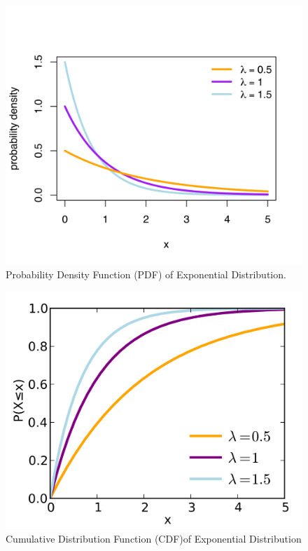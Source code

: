 \begin{figure}[h!]
\begin{center}
	\includegraphics[scale=0.1]{exponential_pdf.png}
	\caption[]{Probability Density Function (PDF) of Exponential Distribution.}
	\label{fairdiepmf}
	\end{center}
	\end{figure}
	
\begin{figure}[h!]
\begin{center}
	\includegraphics[scale=0.07]{exponential_cdf.png}
	\caption[]{Cumulative Distribution Function (CDF)of Exponential Distribution}
	\label{fairdiepmf}
	\end{center}
	\end{figure}

